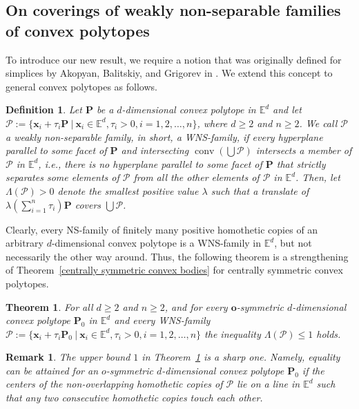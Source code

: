 \documentclass[12pt]{article}
\newtheorem{thm}{Theorem}
\newtheorem{defn}{Definition}
\newtheorem{rem}{Remark}
\DeclareMathOperator{\conv}{conv}
\newcommand{\xx}{\mathbf{x}}
\newcommand{\Ee}{{\mathbb E}}
\begin{document}
\subsection{On coverings of weakly non-separable families of convex polytopes}

To introduce our new result, we require a notion that was originally defined for simplices by Akopyan, Balitskiy, and Grigorev in \cite{ABG}. We extend this concept to general convex polytopes as follows.

\begin{defn}\label{erdos extended}
Let $\mathbf{P}$ be a $d$-dimensional convex polytope in $\Ee^d$ and let $\mathcal{P} := \{ \xx_i + \tau_i \mathbf{P}\ |\  \xx_i\in \Ee^d, \tau_i>0, i=1,2,\ldots, n\}$, where $d\ge 2$ and $n\ge 2$.
We call $\mathcal{P}$ a {\rm weakly non-separable family}, in short, a {\rm WNS-family}, if every hyperplane parallel to some facet of $\mathbf{P}$ and intersecting $\conv \left( \bigcup \mathcal{P} \right)$ intersects a member of $\mathcal{P}$ in $\Ee^d$, i.e., there is no hyperplane parallel to some facet of $\mathbf{P}$ that strictly separates some elements of $\mathcal{P}$ from all the other elements of $\mathcal{P}$ in $\Ee^d$. Then, let $\Lambda(\mathcal{P}) > 0$ denote the smallest positive value $\lambda$ such that a translate of
$\lambda \left( \sum_{i=1}^n \tau_i \right) \mathbf{P}$ covers $\bigcup \mathcal{P}$.
\end{defn}

Clearly, every NS-family of finitely many positive homothetic copies of an arbitrary $d$-dimensional convex polytope is a WNS-family in $\Ee^d$, but not necessarily the other way around. Thus, the following theorem is a strengthening of Theorem~\ref{centrally symmetric convex bodies} for centrally symmetric convex polytopes. 

\begin{thm}\label{centrally symmetric convex bodies revisited}
For all $d\ge 2$ and $n\ge 2$, and for every $\mathbf{o}$-symmetric $d$-dimensional convex polytope $\mathbf{P}_0$ in $\Ee^d$ and every WNS-family $\mathcal{P} := \{ \xx_i + \tau_i \mathbf{P}_0\ |\  \xx_i\in \Ee^d, \tau_i>0, i=1,2,\ldots, n\}$ the inequality $\Lambda(\mathcal{P}) \leq 1$ holds. 
\end{thm}

\begin{rem}
The upper bound $1$ in Theorem~\ref{centrally symmetric convex bodies revisited} is a sharp one. Namely, equality can be attained for an $o$-symmetric $d$-dimensional convex polytope $\mathbf{P}_0$ if the centers of the non-overlapping homothetic copies of $\mathcal{P}$ lie on a line in $\Ee^d$ such that any two consecutive homothetic copies touch each other. 
\end{rem}
\end{document}
